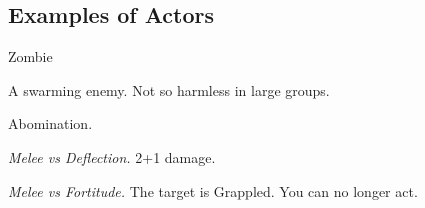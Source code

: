 \newpage
\subsection{Examples of Actors}


\begin{monsterboxbg}{Zombie}

    A swarming enemy. Not so harmless in large groups.
    
    \rpghline
    \stats[
        STR = \stat{12}, 
        DEX = \stat{12},
        CON = \stat{8},
        INT = \stat{6},
        WIS = \stat{8},
        CHA = \stat{10},
    ]
    \rpghline

    \basics[
    armorclass = 0,
    hitpoints  = 12,
    focus      = 1,
    defenses   = {Deflection 1, Reflex 1, Fortitude 0, Will -2}
    ]
    \rpghline

    \details[%
    accuracies = {Melee 2, Ranged -2},
    challenge = Weak,
    ]
    \rpghline%
    \begin{rpg-monsteraction}
        Abomination.
    \end{rpg-monsteraction}

    

    \begin{rpg-monsteraction}
        \textit{Melee vs Deflection.} 2+1 damage.
    \end{rpg-monsteraction}

    \begin{rpg-monsteraction}[Ensnare]
        \textit{Melee vs Fortitude.} The target is Grappled. You can no longer act.
    \end{rpg-monsteraction}


\end{monsterboxbg}



